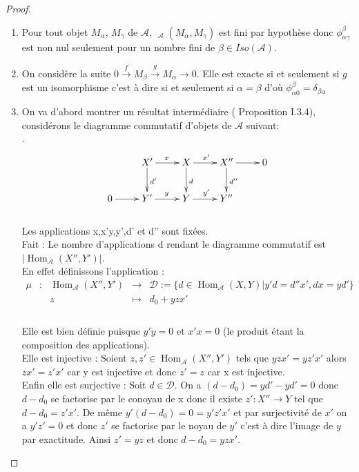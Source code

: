 \documentclass[12pt]{article}
\DeclareMathOperator{\Hom}{Hom}
\DeclareMathOperator{\ext}{Ext^{1}}
\theoremstyle{definition}
\begin{document}
\begin{proof}
\begin{enumerate}
\item Pour tout objet $M_{\alpha}$, $M_{\gamma}$ de $\mathcal{A}$, $\ext_{\mathcal{A}}(M_{\alpha}, M_{\gamma})$ est fini par hypothèse donc $\phi^{\beta}_{\alpha\gamma}$ est non nul seulement pour un nombre fini de $\beta\in Iso(\mathcal{A})$.
\item On considère la suite  $0\overset{f} {\longrightarrow} M_{\beta}\overset{g}{\longrightarrow} M_{\alpha}\longrightarrow 0$. Elle est exacte si et seulement si $g$ est un isomorphisme c'est à dire si et seulement si $\alpha=\beta$ d'où $\phi^{\beta}_{\alpha 0}=\delta_{\beta\alpha}$
\item On va d'abord montrer un résultat intermédiaire (\cite{Ringel4} Proposition I.3.4), considérons le diagramme commutatif d'objets de $\mathcal{A}$ suivant:\\.
$$\xymatrix{
    & X' \ar[r]^{x}  \ar[d]^{d'} & X \ar[r]^{x'}\ar[d]^{d} & X''\ar[d]^{d''}\ar[r]& 0 \\
    0\ar[r]& Y' \ar[r]^{y} & Y \ar[r]^{y'}& Y'' &
  }$$\\
Les applications x,x'y,y',d' et d'' sont fixées.\\
Fait :  Le nombre d'applications d rendant le diagramme commutatif est $|\Hom_\mathcal{A}(X'',Y')|$.\\
En effet définissons l'application : $$\begin{array}{ccccc}
\mu & : & \Hom_{\mathcal{A}}(X'',Y') & \to & \mathcal{D}:=\{d\in  \Hom_{\mathcal{A}}(X,Y)|y'd=d''x', dx=yd'\}  \\
 & & z & \mapsto & d_{0}+yzx' \\
\end{array}$$\\
Elle est bien définie puisque $y'y=0$ et $x'x=0$ (le produit étant la composition des applications).\\
Elle est injective : Soient $z,z'\in \Hom_{\mathcal{A}}(X'',Y')$ tels que $yzx'=yz'x'$ alors $zx'=z'x'$ car y est injective et donc $z'=z$ car x est injective.\\
Enfin elle est surjective : Soit $d\in\mathcal{D}$. On a $(d-d_{0})=yd'-yd'=0$ donc $d-d_{0}$ se factorise par le conoyau de x donc il existe $z':X''\to Y$ tel que $d-d_{0}=z'x'$. De même $y'(d-d_{0})=0=y'z'x'$ et par surjectivité de $x'$ on a $y'z'=0$ et donc $z'$ se factorise par le noyau de $y'$ c'est à dire l'image de $y$ par exactitude. Ainsi $z'=yz$ et donc $d-d_{0}=yzx'$.\\

\end{enumerate}
\end{proof}
\end{document}
